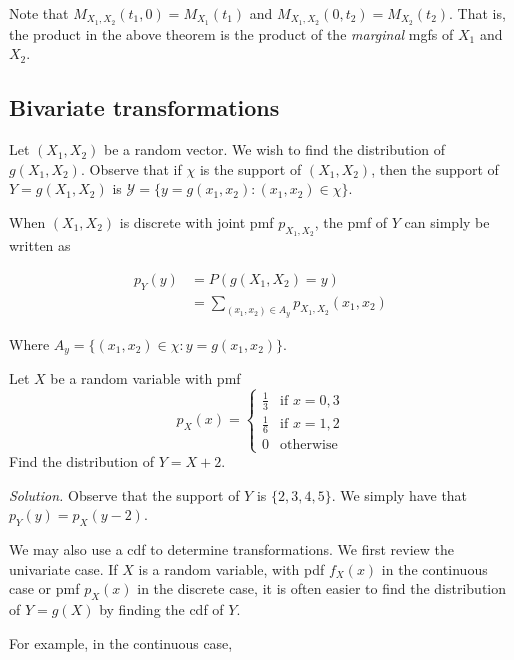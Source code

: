 Note that $M_{X_1,X_2}(t_1,0)=M_{X_1}(t_1)$ and $M_{X_1,X_2}(0,t_2)=M_{X_2}(t_2)$. That is, the product in the above theorem is the product of the \textit{marginal} mgfs of $X_1$ and $X_2$.

\subsection{Bivariate transformations}

Let $(X_1,X_2)$ be a random vector. We wish to find the distribution of $g(X_1,X_2)$. Observe that if $\chi$ is the support of $(X_1,X_2)$, then the support of $Y=g(X_1,X_2)$ is $\mathcal Y=\{y=g(x_1,x_2):(x_1,x_2)\in\chi\}$.

When $(X_1,X_2)$ is discrete with joint pmf $p_{X_1,X_2}$, the pmf of $Y$ can simply be written as

\begin{align*}
	p_Y(y)&=P(g(X_1,X_2)=y)\\
	&=\sum_{(x_1,x_2)\in A_y}p_{X_1,X_2}(x_1,x_2)
\end{align*}

Where $A_y=\{(x_1,x_2)\in\chi:y=g(x_1,x_2)\}$.

\begin{example}[]
	Let $X$ be a random variable with pmf
	$$p_X(x)=\begin{cases}
		\frac 13 &\text{if $x=0,3$}\\
		\frac 16 &\text{if $x=1,2$}\\
		0 &\text{otherwise}
	\end{cases}$$
	Find the distribution of $Y=X+2$.

	\textit{Solution.} Observe that the support of $Y$ is $\{2,3,4,5\}$. We simply have that $p_Y(y)=p_X(y-2)$.
\end{example}

We may also use a cdf to determine transformations. We first review the univariate case. If $X$ is a random variable, with pdf $f_X(x)$ in the continuous case or pmf $p_X(x)$ in the discrete case, it is often easier to find the distribution of $Y=g(X)$ by finding the cdf of $Y$.

For example, in the continuous case, 

